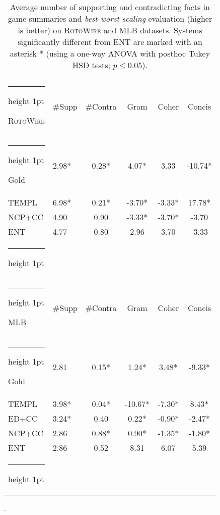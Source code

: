 \documentclass[11pt,a4paper]{article}
\makeatletter
\newcommand{\thickhline}{\noalign {\ifnum 0=`}\fi \hrule height 1pt
    \futurelet \reserved@a \@xhline
}
\makeatother
\begin{document}
\begin{table}[t]
\small
\centering
\begin{tabular}{@{~}l@{~~}l@{~~}c@{~~}c@{~~}c@{~~}c@{~}}
\thickhline 
\textsc{RotoWire} & \#Supp & \#Contra & Gram & Coher & Concis \\
\thickhline 
Gold    & 2.98* & \hspace*{.15cm}0.28* & \hspace*{.1cm}4.07* & \hspace*{-.15cm}3.33& \hspace*{-.1cm}-10.74* \\
TEMPL   & 6.98* & \hspace*{.15cm}0.21* & -3.70*& \hspace*{-.1cm}-3.33* & 17.78*\\
NCP+CC  & 4.90 & 0.90 & -3.33* & \hspace*{-.1cm}-3.70*&\hspace*{-.1cm}-3.70\\
ENT  & 4.77 & 0.80 & 2.96 & \hspace*{-.15cm}3.70&\hspace*{-.1cm}-3.33\\ \thickhline
\multicolumn{6}{c}{} \\
\thickhline 
MLB & \#Supp & \#Contra & Gram & Coher & Concis \\ \thickhline
Gold    & 2.81 & 0.15* & \hspace*{.3cm}1.24* & \hspace*{.1cm}3.48* & -9.33* \\
TEMPL   & 3.98* & 0.04* & -10.67* & -7.30*& \hspace*{.1cm}8.43* \\
ED+CC & 3.24* & \hspace*{-.15cm}0.40 & \hspace*{.3cm}0.22* & -0.90* & -2.47*  \\
NCP+CC  & 2.86 & 0.88* & \hspace*{.3cm}0.90* & -1.35*& -1.80* \\
ENT  & 2.86 & \hspace*{-.15cm}0.52 & \hspace*{.13cm}8.31 & 6.07 &\hspace*{-.05cm}5.39\\
\thickhline 
\end{tabular} 
\caption{Average number of supporting and contradicting facts
  in game summaries and   \textit{best-worst scaling}
  evaluation (higher is better) on \textsc{RotoWire} and MLB datasets. 
  Systems significantly different from ENT are marked with an asterisk * (using a one-way ANOVA with
  posthoc Tukey HSD tests; \mbox{$p\leq0.05$}).}.
  \label{tbl:mlb-human-eval}
\end{table}
\end{document}

